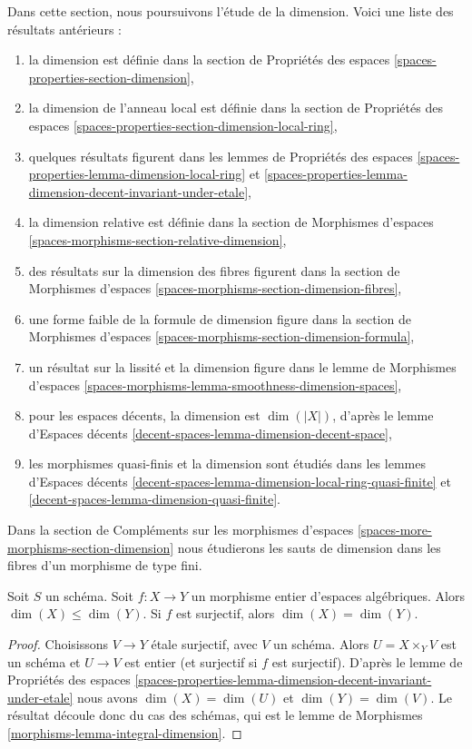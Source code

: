 \noindent
Dans cette section, nous poursuivons l'étude de la dimension.
Voici une liste des résultats antérieurs :
\begin{enumerate}
\item la dimension est définie dans la
section de Propriétés des espaces
\ref{spaces-properties-section-dimension},
\item la dimension de l'anneau local est définie dans la
section de Propriétés des espaces
\ref{spaces-properties-section-dimension-local-ring},
\item quelques résultats figurent dans les lemmes de Propriétés des espaces
\ref{spaces-properties-lemma-dimension-local-ring} et
\ref{spaces-properties-lemma-dimension-decent-invariant-under-etale},
\item la dimension relative est définie dans la
section de Morphismes d'espaces \ref{spaces-morphisms-section-relative-dimension},
\item des résultats sur la dimension des fibres figurent dans la
section de Morphismes d'espaces \ref{spaces-morphisms-section-dimension-fibres},
\item une forme faible de la formule de dimension figure dans la
section de Morphismes d'espaces \ref{spaces-morphisms-section-dimension-formula},
\item un résultat sur la lissité et la dimension figure dans le lemme de Morphismes d'espaces
\ref{spaces-morphisms-lemma-smoothness-dimension-spaces},
\item pour les espaces décents, la dimension est $\dim(|X|)$, d'après le
lemme d'Espaces décents \ref{decent-spaces-lemma-dimension-decent-space},
\item les morphismes quasi-finis et la dimension sont étudiés dans les
lemmes d'Espaces décents
\ref{decent-spaces-lemma-dimension-local-ring-quasi-finite} et
\ref{decent-spaces-lemma-dimension-quasi-finite}.
\end{enumerate}
Dans la section de Compléments sur les morphismes d'espaces
\ref{spaces-more-morphisms-section-dimension}
nous étudierons les sauts de
dimension dans les fibres d'un morphisme de type fini.

\begin{lemma}
\label{lemma-integral-dimension}
Soit $S$ un schéma. Soit $f : X \to Y$ un morphisme entier
d'espaces algébriques. Alors $\dim(X) \leq \dim(Y)$.
Si $f$ est surjectif, alors $\dim(X) = \dim(Y)$.
\end{lemma}

\begin{proof}
Choisissons $V \to Y$ \'etale surjectif, avec $V$ un schéma.
Alors $U = X \times_Y V$ est un schéma et $U \to V$ est entier
(et surjectif si $f$ est surjectif).
D'après le lemme de Propriétés des espaces
\ref{spaces-properties-lemma-dimension-decent-invariant-under-etale}
nous avons $\dim(X) = \dim(U)$ et $\dim(Y) = \dim(V)$.
Le résultat découle donc du cas des schémas,
qui est le lemme de Morphismes \ref{morphisms-lemma-integral-dimension}.
\end{proof}

